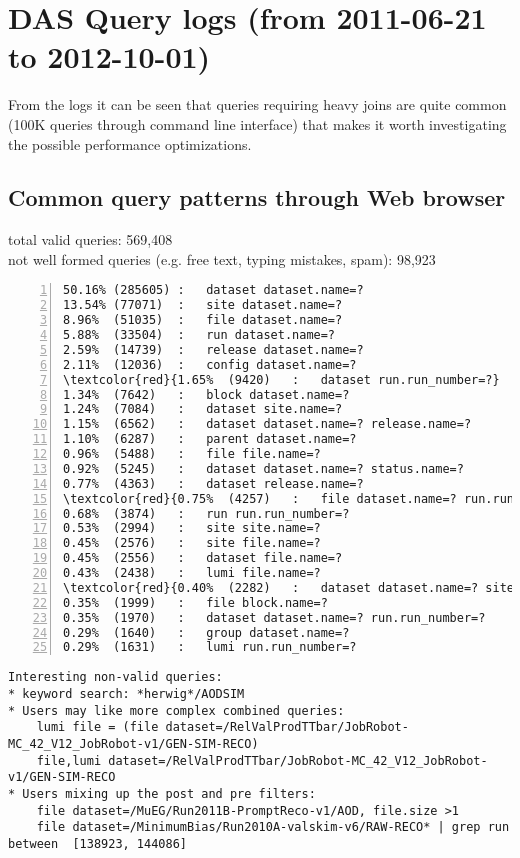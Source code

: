 \section{DAS Query logs (from 2011-06-21 to 2012-10-01)}

From the logs it can be seen that queries requiring heavy joins are quite common (100K queries through command line interface) that makes it worth investigating the possible performance optimizations.

\subsection{Common query patterns through Web browser}
total valid queries: 569,408
\\
not well formed queries (e.g. free text, typing mistakes, spam): 98,923

\begin{Verbatim}[commandchars=\\\{\},numbers=left,numbersep=4pt]
50.16% (285605)	:	dataset dataset.name=?
13.54% (77071)	:	site dataset.name=?
8.96%  (51035)	:	file dataset.name=?
5.88%  (33504)	:	run dataset.name=?
2.59%  (14739)	:	release dataset.name=?
2.11%  (12036)	:	config dataset.name=?
\textcolor{red}{1.65%  (9420) 	:	dataset run.run_number=?}
1.34%  (7642) 	:	block dataset.name=?
1.24%  (7084) 	:	dataset site.name=?
1.15%  (6562) 	:	dataset dataset.name=? release.name=?
1.10%  (6287) 	:	parent dataset.name=?
0.96%  (5488) 	:	file file.name=?
0.92%  (5245) 	:	dataset dataset.name=? status.name=?
0.77%  (4363) 	:	dataset release.name=?
\textcolor{red}{0.75%  (4257) 	:	file dataset.name=? run.run_number=?}
0.68%  (3874) 	:	run run.run_number=?
0.53%  (2994) 	:	site site.name=?
0.45%  (2576) 	:	site file.name=?
0.45%  (2556) 	:	dataset file.name=?
0.43%  (2438) 	:	lumi file.name=?
\textcolor{red}{0.40%  (2282) 	:	dataset dataset.name=? site.name=?}
0.35%  (1999) 	:	file block.name=?
0.35%  (1970) 	:	dataset dataset.name=? run.run_number=?
0.29%  (1640) 	:	group dataset.name=?
0.29%  (1631) 	:	lumi run.run_number=?
\end{Verbatim}

{\small
\begin{verbatim}
Interesting non-valid queries:
* keyword search: *herwig*/AODSIM
* Users may like more complex combined queries:
    lumi file = (file dataset=/RelValProdTTbar/JobRobot-MC_42_V12_JobRobot-v1/GEN-SIM-RECO)
    file,lumi dataset=/RelValProdTTbar/JobRobot-MC_42_V12_JobRobot-v1/GEN-SIM-RECO
* Users mixing up the post and pre filters:
    file dataset=/MuEG/Run2011B-PromptReco-v1/AOD, file.size >1
    file dataset=/MinimumBias/Run2010A-valskim-v6/RAW-RECO* | grep run between  [138923, 144086] 
\end{verbatim}
}

